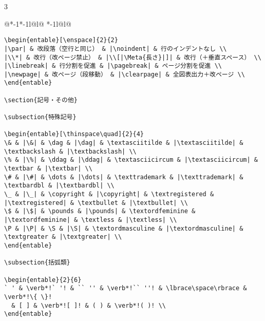 \documentclass[10pt,a4paper,landscape,dvipdfmx,nomag]{jsarticle}
\makeatletter
\def\set@etsep#1#2{\def\etcolsep{#1}\def\etitemsep{#2}}
\newenvironment{entable}[3][\quad\qquad]{%
  \set@etsep#1\relax\relax
  \begin{tabular}{%
    @{}*{\the\numexpr#3-1}{*{\the\numexpr#2-1}{l@{\etcolsep}}l@{\etitemsep}}%
    *{\the\numexpr#2-1}{l@{\etcolsep}}l@{}}}{%
  \end{tabular}}
\let\lbrace\{ \let\rbrace\}
\newcommand{\Meta}[1]{$\langle$\mbox{}\emph{#1}\mbox{}$\rangle$}
\makeatother
\begin{document}
\begin{multicols}{3}
\begin{entable}[\enspace]{2}{1}
\begin{verbatim}
\begin{entable}[\enspace]{2}{2}
|\par| & 改段落（空行と同じ） & |\noindent| & 行のインデントなし \\
|\\*| & 改行（改ページ禁止） & |\\[|\Meta{長さ}|]| & 改行（＋垂直スペース） \\
|\linebreak| & 行分割を促進 & |\pagebreak| & ページ分割を促進 \\
|\newpage| & 改ページ（段移動） & |\clearpage| & 全図表出力＋改ページ \\
\end{entable}

\section{記号・その他}

\subsection{特殊記号}

\begin{entable}[\thinspace\quad]{2}{4}
\& & |\&| & \dag & |\dag| & \textasciitilde & |\textasciitilde| & \textbackslash & |\textbackslash| \\
\% & |\%| & \ddag & |\ddag| & \textasciicircum & |\textasciicircum| & \textbar & |\textbar| \\
\# & |\#| & \dots & |\dots| & \texttrademark & |\texttrademark| & \textbardbl & |\textbardbl| \\
\_ & |\_| & \copyright & |\copyright| & \textregistered & |\textregistered| & \textbullet & |\textbullet| \\
\$ & |\$| & \pounds & |\pounds| & \textordfeminine & |\textordfeminine| & \textless & |\textless| \\
\P & |\P| & \S & |\S| & \textordmasculine & |\textordmasculine| & \textgreater & |\textgreater| \\
\end{entable}

\subsection{括弧類}

\begin{entable}{2}{6}
` ' & \verb*!` '! & `` '' & \verb*!`` ''! & \lbrace\space\rbrace & \verb*!\{ \}!
  & [ ] & \verb*![ ]! & ( ) & \verb*!( )! \\
\end{entable}


\end{verbatim}
\end{entable}
\end{multicols}
\end{document}
